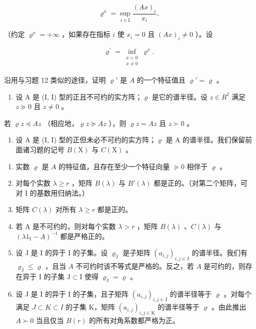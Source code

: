 \[
\varrho^ {x} = \sup _ {i \in \mathrm{I}} \frac {(A x) _ {i}}{x _ {i}},
\]

（约定 \(\varrho^x = +\infty\) ，如果存在指标 \(i\) 使 \(x_i = 0\) 且 \((Ax)_i \neq 0\) ）。设

\[
\varrho^{\prime} = \inf_{\substack{x\succ 0\\ x\neq 0}}\varrho^{x}.
\]

沿用与习题 12 类似的途径，证明 \(\varrho'\) 是 \(A\) 的一个特征值且 \(\varrho' = \varrho\) 。

\begin{enumerate}
\def\labelenumi{\arabic{enumi})}
\setcounter{enumi}{18}
\tightlist
\item
  设 A 是 (I, I) 型的正且不可约的实方阵；\(\varrho\) 是它的谱半径。设 \(z \in R^{I}\) 满足 \(z \succcurlyeq 0\) 且 \(z \neq 0\) 。
\end{enumerate}

若 \(\varrho z \preccurlyeq Az\) （相应地，\(\varrho z \succcurlyeq Az\) ），则 \(\varrho z = Az\) 且 \(z \succ 0\) 。

\begin{enumerate}
\def\labelenumi{\arabic{enumi})}
\setcounter{enumi}{19}
\tightlist
\item
  设 A 是 (I, I) 型的正但未必不可约的实方阵；\(\varrho\) 是 A 的谱半径。我们保留前面诸习题的记号 \(B(\mathrm{X})\) 与 \(C(\mathrm{X})\) 。
\end{enumerate}

\begin{enumerate}
\def\labelenumi{\alph{enumi})}
\item
  实数 \(\varrho\) 是 \(A\) 的特征值，且存在至少一个特征向量 \(\succcurlyeq 0\) 相伴于 \(\varrho\) 。
\item
  对每个实数 \(\lambda \geqslant r\) ，矩阵 \(B(\lambda)\) 与 \(B'(\lambda)\) 都是正的。（对第二个矩阵，可对 I 的基数用归纳法。）
\item
  矩阵 \(C(\lambda)\) 对所有 \(\lambda \geqslant r\) 都是正的。
\item
  若 A 是不可约的，则对每个实数 \(\lambda > r\) ，矩阵 \(B(\lambda)\) 、\(C(\lambda)\) 与 \((\lambda1_{\mathrm{I}} - A)^{-1}\) 都是严格正的。
\item
  设 J 是 I 的异于 I 的子集。设 \(\varrho_{\mathrm{J}}\) 是子矩阵 \((a_{i,j})_{i,j\in \mathrm{J}}\) 的谱半径。我们有 \(\varrho_{\mathrm{J}}\leqslant \varrho\) ，且当 \(A\) 不可约时该不等式是严格的。反之，若 \(A\) 是可约的，则存在异于 I 的子集 \(\mathrm{J}\subset \mathrm{I}\) 使得 \(\varrho_{\mathrm{J}} = \varrho\) 。
\item
  设 J 是 I 的异于 I 的子集，且子矩阵 \((a_{i,j})_{i,j\in\mathrm{J}}\) 的谱半径等于 \(\varrho\) 。对每个满足 \(J\subset K\subset I\) 的子集 K，矩阵 \((a_{i,j})_{i,j\in\mathrm{K}}\) 的谱半径等于 \(\varrho\) 。由此推出 \(A\succ0\) 当且仅当 \(B(r)\) 的所有对角系数都严格为正。
\end{enumerate}

